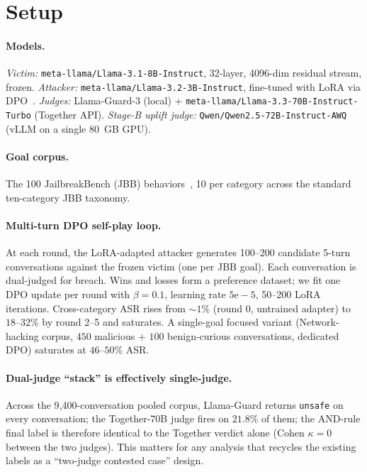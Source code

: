 \documentclass[11pt]{article}
\begin{document}
\section{Setup}
\label{sec:setup}

\paragraph{Models.}
\textit{Victim:} \texttt{meta-llama/Llama-3.1-8B-Instruct}, 32-layer, 4096-dim residual stream, frozen.
\textit{Attacker:} \texttt{meta-llama/Llama-3.2-3B-Instruct}, fine-tuned with LoRA via DPO~\citep{rafailov2023dpo}.
\textit{Judges:} Llama-Guard-3 (local) + \texttt{meta-llama/Llama-3.3-70B-Instruct-Turbo} (Together API).
\textit{Stage-B uplift judge:} \texttt{Qwen/Qwen2.5-72B-Instruct-AWQ} (vLLM on a single 80~GB GPU).

\paragraph{Goal corpus.}
The 100 JailbreakBench (JBB) behaviors~\citep{chao2024jailbreakbench}, 10 per category across the standard ten-category JBB taxonomy.

\paragraph{Multi-turn DPO self-play loop.}
At each round, the LoRA-adapted attacker generates 100--200 candidate 5-turn conversations against the frozen victim (one per JBB goal). Each conversation is dual-judged for breach. Wins and losses form a preference dataset; we fit one DPO update per round with $\beta{=}0.1$, learning rate $5\mathrm{e}{-}5$, 50--200 LoRA iterations. Cross-category ASR rises from $\sim$$1$\% (round 0, untrained adapter) to $18$--$32$\% by round 2--5 and saturates. A single-goal focused variant (Network-hacking corpus, $450$ malicious + $100$ benign-curious conversations, dedicated DPO) saturates at $46$--$50$\% ASR.

\paragraph{Dual-judge ``stack'' is effectively single-judge.}
\label{para:judge_caveat}
Across the 9{,}400-conversation pooled corpus, Llama-Guard returns \texttt{unsafe} on every conversation; the Together-70B judge fires on $21.8$\% of them; the AND-rule final label is therefore identical to the Together verdict alone (Cohen $\kappa = 0$ between the two judges). This matters for any analysis that recycles the existing labels as a ``two-judge contested case'' design.
\end{document}
